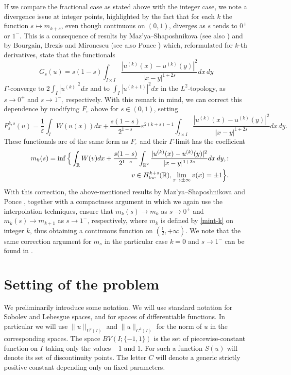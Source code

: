 \documentclass{article}
\newcommand{\e}{\varepsilon}
\begin{document}
\medskip
If we compare the fractional case as stated above with the integer case, we note a divergence issue at integer points,
highlighted by the fact that  for each $k$ the function $s\mapsto m_{k+s}$, even though continuous on $(0,1)$, diverges as $s$ tends to $0^+$ or $1^-$. This is a consequence of results by Maz'ya--Shaposhnikova \cite{MS} (see also \cite[Section 1]{CKP}) and by Bourgain, Brezis and Mironescu \cite{BBM} (see also Ponce \cite{ponce}) which, reformulated for $k$-th derivatives, state that
the functionals 
$$
G_s(u)=s(1-s) \int_{I\times I}\frac{|u^{(k)}(x)-u^{(k)}(y)|^2}{|x-y|^{1+2s}} dx\,dy
$$
$\Gamma$-converge to $2\int_I |u^{(k)}|^2dx$ and to $\int_I |u^{(k+1)}|^2dx$ in the $L^2$-topology, as $s\to 0^+$ and $s\to 1^-$, respectively. With this remark in mind, we can correct this dependence by modifying  $F_\e$ above  for $s\in(0,1)$, setting
$$
F^{k,s}_\e(u)=\frac1\e\int_I W(u(x))dx+\frac{s(1-s)}{2^{1-s}}\e^{2(k+s)-1}\int_{I\times I}\frac{|u^{(k)}(x)-u^{(k)}(y)|^2}{|x-y|^{1+2s}} dx\,dy.
$$ 
These functionals are of the same form as $F_\e$ and their $\Gamma$-limit has the coefficient
\begin{eqnarray}\label{emmeks}\nonumber
&& m_{k}(s) =\inf\Big\{\int_{\mathbb R} W(v)dx+\frac{s(1-s)}{2^{1-s}}\int_{\mathbb R^2}\frac{|u^{(k)}(x)-u^{(k)}(y)|^2}{|x-y|^{1+2s}} dx\,dy,
 :\\
&&\hskip3cm v\in H^{k+s}_{\rm loc}(\mathbb R), \lim_{x\to\pm\infty}v(x)=\pm1\Big\}.
\end{eqnarray}
With this correction, the above-mentioned results by Maz'ya--Shaposhnikova \cite{MS} and Ponce \cite{ponce}, together with a compactness argument in which we again use the interpolation techniques, ensure that $m_{k}(s)\to m_k$ as $s\to 0^+$ and $m_{k}(s)\to m_{k+1}$ as $s\to 1^-$, respectively, where $m_k$ is defined by \eqref{mint-k} on integer $k$, thus obtaining a continuous function on $(\frac12,+\infty)$. We note that the same correction argument for $m_s$ in the particular case $k=0$ and $s\to 1^-$ can be found in \cite{PaVi}.



\section{Setting of the problem}
We preliminarily introduce some notation. We will use standard notation for  Sobolev and Lebesgue spaces, and for spaces of differentiable functions. In particular we will use $\|u\|_{L^p(I)}$ and $\|u\|_{C^k(I)}$ for the norm of $u$ in the corresponding spaces. The space $BV(I;\{-1,1\})$ is the set of piecewise-constant function on $I$ taking only the values $-1$ and $1$. For such a function $S(u)$ will denote its set of discontinuity points.
The letter $C$ will denote a generic strictly positive constant depending only on fixed parameters.
\end{document}
